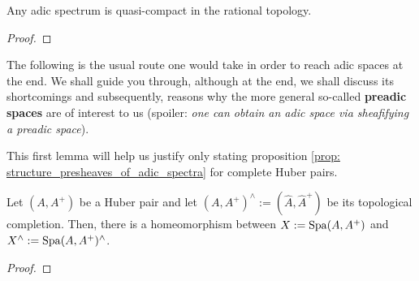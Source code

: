             \begin{corollary} \label{coro: adic_spectra_are_quasi_compact}
                Any adic spectrum is quasi-compact in the rational topology.
            \end{corollary}
                \begin{proof}
                    
                \end{proof}
            
            The following is the usual route one would take in order to reach adic spaces at the end. We shall guide you through, although at the end, we shall discuss its shortcomings and subsequently, reasons why the more general so-called \textbf{preadic spaces} are of interest to us (spoiler: \textit{one can obtain an adic space via sheafifying a preadic space}).
            
            This first lemma will help us justify only stating proposition \ref{prop: structure_presheaves_of_adic_spectra} for complete Huber pairs.
            \begin{lemma} \label{lemma: adic_spectra_of_complete_huber_pairs}
                Let $(A, A^+)$ be a Huber pair and let $(A, A^+)^{\wedge} := (\hat{A}, \hat{A}^+)$ be its topological completion. Then, there is a homeomorphism between $X := \mathrm{Spa}(A, A^+)$ and $X^{\wedge} := \mathrm{Spa}(A, A^+)^{\wedge}$.
            \end{lemma}
                \begin{proof}
                    
                \end{proof}
            
